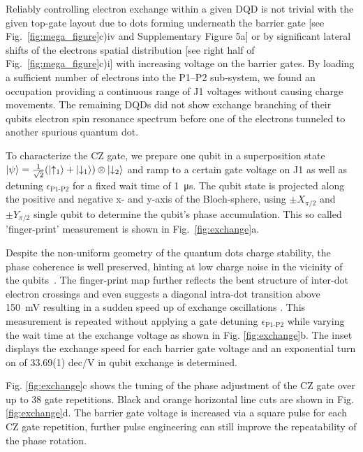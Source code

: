 \documentclass[superscriptaddress,twocolumn,10pt,prl,floatfix,nofootinbib,aps]{revtex4-2}
\newcommand{\change}[1]{%
\textcolor{reviewercolor}{\ignorespaces#1\unskip}%
}
\begin{document}
Reliably controlling electron exchange within a given DQD is not trivial with the given top-gate layout due to dots forming underneath the barrier gate [see Fig.~\ref{fig:mega_figure}c)iv and Supplementary Figure 5a] or by significant lateral shifts of the electrons spatial distribution [see right half of Fig.~\ref{fig:mega_figure}c)i] with increasing voltage on the barrier gates.
By loading a sufficient number of electrons into the  P1--P2 sub-system, we found an occupation providing a continuous range of J1 voltages without causing charge movements.   
\change{
    The remaining DQDs did not show exchange branching of their qubits electron spin resonance spectrum before one of the electrons tunneled to another spurious quantum dot.
    }
To characterize the CZ gate, we prepare one qubit in a superposition state $\ket{\psi} = \frac{1}{\sqrt{2}}(\ket{\uparrow_1} + \ket{\downarrow_1})\otimes\ket{\downarrow_2}$ and ramp to a certain gate voltage on J1 as well as detuning $\epsilon_{\text{P1-P2}}$ for a fixed wait time of \SI{1}{\micro \second}.
The qubit state is projected along the positive and negative x- and y-axis of the Bloch-sphere, using $\pm X_{\pi/2}$ and $\pm Y_{\pi/2}$ single qubit to determine the qubit's phase accumulation. This so called 'finger-print' measurement is shown in Fig.~\ref{fig:exchange}a.

Despite the non-uniform geometry of the quantum dots charge stability, the phase coherence is well preserved, hinting at low charge noise in the vicinity of the qubits~\cite{huang_fidelity_2019}. The finger-print map further reflects the bent structure of inter-dot electron crossings and even suggests a diagonal intra-dot transition above \SI{150}{\milli \volt} resulting in a sudden speed up of exchange oscillations \cite{steinacker_bell_2025}.
This measurement is repeated without applying a gate detuning $\epsilon_{\text{P1-P2}}$ while varying the wait time at the exchange voltage as shown in Fig. \ref{fig:exchange}b. The inset displays the exchange speed for each barrier gate voltage and an exponential turn on of 33.69(1) dec/V in qubit exchange is determined. %

Fig. \ref{fig:exchange}c shows the tuning of the phase adjustment of the CZ gate over up to 38 gate repetitions. Black and orange horizontal line cuts are shown in Fig. \ref{fig:exchange}d.
\change{
    The barrier gate voltage is increased via a square pulse for each CZ gate repetition, further pulse engineering can still improve the repeatability of the phase rotation.
    }
\end{document}
